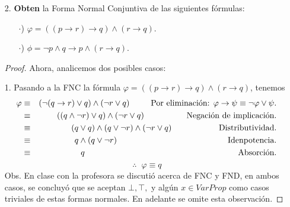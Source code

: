 \documentclass{article}
\begin{document}
\begin{itemize}
\begin{proof}
    $5^{\text{ta}}$ línea por distributividad.
    
    \[
    \therefore\;\;  \varphi \equiv (\neg r \land (p \lor q)) \lor \neg p \lor \neg q \lor r
    \]
    2. Llevemos a $\phi = (p \land (q \rightarrow r)) \rightarrow s$ a FNN, veamos que
    \begin{eqnarray*}
      \phi &\equiv& \neg (p \land (q \rightarrow r)) \lor s
      \hspace*{2cm} \text{Por eliminación: } \varphi \rightarrow \psi \equiv \neg \varphi \lor \psi.\\
      &\equiv& (\neg p \lor \neg (q \rightarrow r)) \lor s
      \hspace*{2cm} \text{Distributividad de la negación.}\\
      &\equiv& (\neg p \lor (q \land \neg r)) \lor s
      \hspace{2.5cm} \text{Negación de la implicación.}
    \end{eqnarray*}
    \[
    \therefore\;\;  \phi \equiv (\neg p \lor (q \land \neg r)) \lor s
    \]
  \end{proof}
  \newpage
\item[2.] \textbf{Obten} la Forma Normal Conjuntiva de las siguientes fórmulas:
  \begin{itemize}
  \item[$\cdot$)] $\varphi = ((p \rightarrow r) \rightarrow q) \land (r \rightarrow q).$
  \item[$\cdot$)] $\phi = \neg p \land q \rightarrow p \land (r \rightarrow q).$
  \end{itemize}
  \begin{proof} Ahora, analicemos dos posibles casos:
    
    1. Pasando a la FNC la fórmula $\varphi = ((p \rightarrow r) \rightarrow q) \land (r \rightarrow q)$,
    tenemos
    \begin{eqnarray*}
      \varphi &\equiv& (\neg (q \rightarrow r)  \lor q) \land (\neg r \lor q)
      \hspace*{0.9cm} \text{Por eliminación: } \varphi \rightarrow \psi \equiv \neg \varphi \lor \psi.\\
      &\equiv& ((q \land \neg r)  \lor q) \land (\neg r \lor q)
      \hspace*{1.8cm} \text{Negación de implicación.}\\
      &\equiv& (q \lor q) \land (q \lor \neg r) \land (\neg r \lor q)
      \hspace{2cm} \text{Distributividad.}\\
      &\equiv& q \land (q \lor \neg r)
      \hspace{4.7cm} \text{Idenpotencia.}\\
      &\equiv& q
      \hspace{6.5cm} \text{Absorción.}\\
    \end{eqnarray*}
    \[\therefore\;\;  \varphi \equiv q\]
    Obs. En clase con la profesora se discutió acerca de FNC y FND, en ambos
    casos, se concluyó que se aceptan $\bot, \top,$ y algún $x \in VarProp$
    como casos triviales de estas formas normales. En adelante se omite esta
    observación.
      

\end{proof}
\end{itemize}
\end{document}
